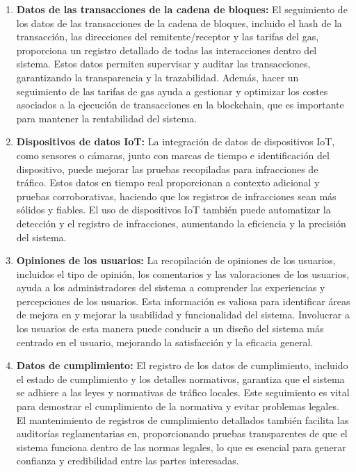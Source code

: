\documentclass[
    letterpaper, 
    man,   
    spanish,
    12pt,
    donotrepeattitle,
    floatsintext,
    hidelinks %
]{apa7}
\begin{document}
\begin{enumerate}
        \item \textbf{Datos de las transacciones de la cadena de bloques: } El seguimiento de los datos de las transacciones de la cadena de bloques, incluido el hash de la transacción, las direcciones del remitente/receptor y las tarifas del gas, proporciona un registro detallado de todas las interacciones dentro del sistema. Estos datos permiten supervisar y auditar las transacciones, garantizando la transparencia y la trazabilidad. Además, hacer un seguimiento de las tarifas de gas ayuda a gestionar y optimizar los costes asociados a la ejecución de transacciones en la blockchain, que es importante para mantener la rentabilidad del sistema. 
        \item \textbf{Dispositivos de datos IoT:} La integración de datos de dispositivos IoT, como sensores o cámaras, junto con marcas de tiempo e identificación del dispositivo, puede mejorar las pruebas recopiladas para infracciones de tráfico. Estos datos en tiempo real proporcionan a contexto adicional y pruebas corroborativas, haciendo que los registros de infracciones sean más sólidos y fiables. El uso de dispositivos IoT también puede automatizar la detección y el registro de infracciones, aumentando la eficiencia y la precisión del sistema.
            \item \textbf{Opiniones de los usuarios: } La recopilación de opiniones de los usuarios, incluidos el tipo de opinión, los comentarios y las valoraciones de los usuarios, ayuda a los administradores del sistema a comprender las experiencias y percepciones de los usuarios. Esta información es valiosa para identificar áreas de mejora en y mejorar la usabilidad y funcionalidad del sistema. Involucrar a los usuarios de esta manera puede conducir a un diseño del sistema más centrado en el usuario, mejorando la satisfacción y la eficacia general. 
                \item \textbf{Datos de cumplimiento: } El registro de los datos de cumplimiento, incluido el estado de cumplimiento y los detalles normativos, garantiza que el sistema se adhiere a las leyes y normativas de tráfico locales. Este seguimiento es vital para demostrar el cumplimiento de la normativa y evitar problemas legales. El mantenimiento de registros de cumplimiento detallados también facilita las auditorías reglamentarias en, proporcionando pruebas transparentes de que el sistema funciona dentro de las normas legales, lo que es esencial para generar confianza y credibilidad entre las partes interesadas.
\end{enumerate}
\end{document}
